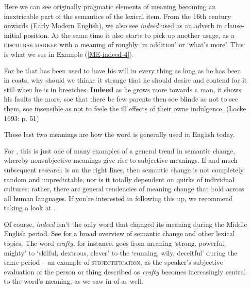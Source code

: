 \noindent Here we can see originally pragmatic elements of meaning becoming an inextricable part of the semantics of the lexical item. From the 16th century onwards (Early Modern English), we also see \emph{indeed} used as an adverb in clause-initial position. At the same time it also starts to pick up another usage, as a \textsc{discourse marker} with a meaning of roughly `in addition' or `what's more'. This is what we see in Example (\ref{ME-indeed-4}).

\begin{exe}
\ex For he that has been used to have his will in every thing as long as he has been in coats, why should we thinke it strange that he should desire and contend for it still when he is in breetches. \textbf{Indeed} as he grows more towards a man, it shows his faults the more, soe that there be few parents then soe blinde as not to see them, soe insensible as not to feele the ill effects of their owne indulgence. \hfill (Locke 1693: p. 51)\label{ME-indeed-4}
\end{exe}

\noindent These last two meanings are how the word is generally used in English today.

For \citet{TraugottDasher2002}, this is just one of many examples of a general trend in semantic change, whereby nonsubjective meanings give rise to subjective meanings. If \citet{TraugottDasher2002} and much subsequent research is on the right lines, then semantic change is not completely random and unpredictable, nor is it totally dependent on quirks of individual cultures: rather, there are general tendencies of meaning change that hold across all human languages. If you're interested in following this up, we recommend taking a look at \citet{TraugottDasher2002}.

Of course, \emph{indeed} isn't the only word that changed its meaning during the Middle English period. See \citet{Sylvester2017} for a broad overview of semantic change and other lexical topics. The word \emph{crafty}, for instance, goes from meaning `strong, powerful, mighty' to `skilful, dextrous, clever' to the  `cunning, wily, deceitful' during the same period -- an example of \textsc{subjectification}, as the speaker's subjective evaluation of the person or thing described as \emph{crafty} becomes increasingly central to the word's meaning, as we saw in  of  as well.


